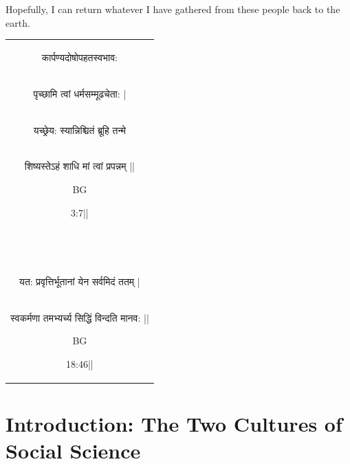 \documentclass[hidelinks,11pt,a4paper]{report}
\begin{document}
Hopefully, I can return whatever I have gathered from these people back to the earth.
\clearpage

\begin{table}[th]
    \centering
    \begin{tabular}{c}
\begin{sanskrit}कार्पण्यदोषोपहतस्वभाव:\end{sanskrit}\\
\begin{sanskrit}पृच्छामि त्वां धर्मसम्मूढचेता: |\end{sanskrit}\\
\begin{sanskrit}यच्छ्रेय: स्यान्निश्चितं ब्रूहि तन्मे\end{sanskrit}\\
\begin{sanskrit}शिष्यस्तेऽहं शाधि मां त्वां प्रपन्नम् ||\end{sanskrit}BG \begin{sanskrit}3:7||\end{sanskrit}\\

\\
\\\\\\\\\\\\\\\\
\begin{sanskrit}यत: प्रवृत्तिर्भूतानां येन सर्वमिदं ततम् |\end{sanskrit}\\
\begin{sanskrit}स्वकर्मणा तमभ्यर्च्य सिद्धिं विन्दति मानव: ||\end{sanskrit}BG \begin{sanskrit}18:46||\end{sanskrit}\\
    \end{tabular}
\end{table}

\clearpage

{\small\tableofcontents}




\chapter{Introduction: The Two Cultures of Social Science}
\setcounter{page}{1}
\end{document}
